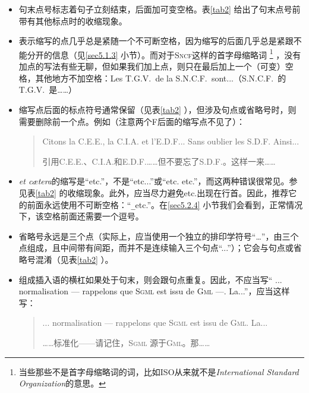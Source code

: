 \begin{itemize}
    \item 句末点号标志着句子立刻结束，后面加可变空格。表\ref{tab2} 给出了句末点号前带有其他标点时的收缩现象。
    \item 表示缩写的点几乎总是紧随一个不可断空格，因为缩写的后面几乎总是紧跟不能分开的信息（见\ref{sec5.1.3} 小节）。而对于\textsc{Sncf}这样的首字母缩略词
    \footnote{当些那些不是首字母缩略词的词，比如ISO从来就不是\emph{International Standard Organization}的意思。}
    ，没有加点的写法有些无聊，但如果我们加上点，则只在最后加上一个（可变）空格，其他地方不加空格：Les T.G.V.\verb*| |de la S.N.C.F.\verb*| |sont...（S.N.C.F.\verb*| |的T.G.V.\verb*| |是……）
    \item 缩写点后面的标点符号通常保留（见表\ref{tab2} ），但涉及句点或省略号时，则需要删除前一个点。例如（注意两个F后面的缩写点不见了）：
    \begin{quote}
        Citons la C.E.E., la C.I.A. et l'E.D.F... Sans oublier les S.D.F. Ainsi...

        \begin{bil}
            引用C.E.E.、C.I.A.和E.D.F.……但不要忘了S.D.F.。这样一来……
        \end{bil}
    \end{quote}
    \item \emph{et cætera}的缩写是``etc.''，不是``etc...''或``etc. etc.''，而这两种错误很常见。参见表\ref{tab2} 的收缩现象。此外，应当尽力避免etc.出现在行首。因此，推荐它的前面永远使用不可断空格：``\verb|_|etc.''。在\ref{sec5.2.4} 小节我们会看到，正常情况下，该空格前面还需要一个逗号。
    \item 省略号永远是三个点（实际上，应当使用一个独立的排印学符号``…''，由三个点组成，且中间带有间距，而并不是连续输入三个句点``...''）；它会与句点或省略号混淆（见表\ref{tab2} ）。
    \item 组成插入语的横杠如果处于句末，则会跟句点重复。因此，不应当写`` ... normalisation --- rappelons que \textsc{Sgml} est issu de \textsc{Gml} ---. La...''，应当这样写：
    \begin{quote}
        ... normalisation --- rappelons que \textsc{Sgml} est issu de \textsc{Gml}. La...
        
        \begin{bil}
            ……标准化——请记住，\textsc{Sgml} 源于\textsc{Gml}。那……
        \end{bil}
    \end{quote}
\end{itemize}

